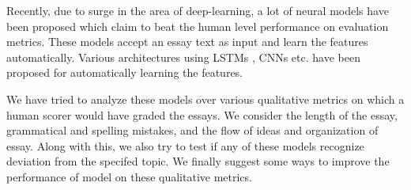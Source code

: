 \documentclass[11pt,a4paper]{article}
\begin{document}
Recently, due to surge in the area of deep-learning, a lot of neural models have been proposed which claim to beat the human level performance on evaluation metrics. These models accept an essay text as input and learn the features automatically. Various architectures using LSTMs \cite{taghipour2016neural}, CNNs\cite{dong2016automatic} etc. have been proposed for automatically learning the features. 



We have tried to analyze these models over various qualitative metrics on which a human scorer would have graded the essays. We consider the length of the essay, grammatical and spelling mistakes, and the flow of ideas and organization of essay. Along with this, we also try to test if any of these models recognize deviation from the specifed topic. We finally suggest some ways to improve the performance of model on these qualitative metrics.
\end{document}
